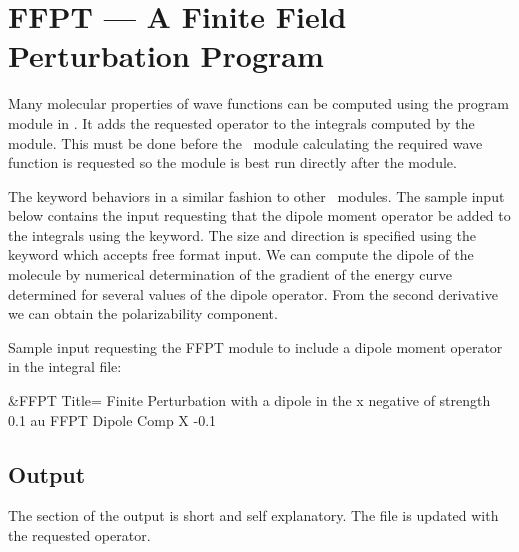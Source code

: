 \section{FFPT --- A Finite Field Perturbation Program}
\label{TUT:sec:ffpt}
Many molecular properties of wave functions can be computed using the 
 program module in \molcas.  It adds the requested operator to 
the integrals computed by the  module.  This must be done 
before the \molcas\ module calculating the required wave function is requested 
so the  module is best run directly after the 
module.

The  keyword behaviors in a similar fashion to other
\molcas\ modules.
The sample input below contains the  input
requesting that the dipole moment operator be added to the integrals
using the  keyword.
The size and direction is specified using the  keyword
which accepts free format input.  We can compute the dipole of the
molecule by numerical determination of the gradient of the energy
curve determined for several values of the dipole operator. From the second
derivative we can obtain the polarizability component.

Sample input requesting the FFPT module to
include a dipole moment operator in the integral file:
\begin{inputlisting}
 &FFPT
Title= Finite Perturbation with a dipole in the x negative of strength 0.1 au
FFPT
Dipole
 Comp 
 X -0.1
\end{inputlisting}

\subsection{ Output}

The  section of the output is short and self
explanatory.  The  file is updated with the requested
operator.

